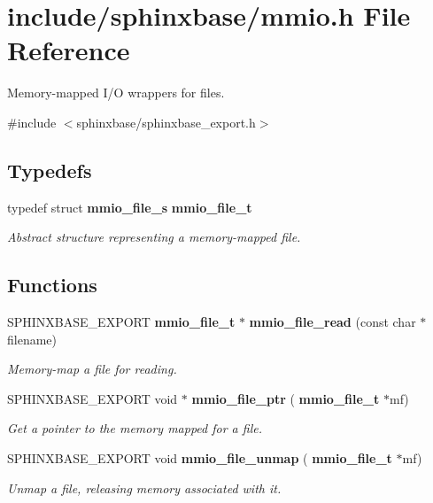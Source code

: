 \section{include/sphinxbase/mmio.h File Reference}
\label{mmio_8h}


Memory-\/mapped I/O wrappers for files.  


{\ttfamily \#include $<$sphinxbase/sphinxbase\+\_\+export.\+h$>$}\newline
\subsection*{Typedefs}
\begin{DoxyCompactItemize}
\item 
\mbox{\label{mmio_8h_ae27ed04d8142d77aae885c8cb8c9fa3b}} 
typedef struct \textbf{ mmio\+\_\+file\+\_\+s} \textbf{ mmio\+\_\+file\+\_\+t}
\begin{DoxyCompactList}\small\item\em Abstract structure representing a memory-\/mapped file. \end{DoxyCompactList}\end{DoxyCompactItemize}
\subsection*{Functions}
\begin{DoxyCompactItemize}
\item 
S\+P\+H\+I\+N\+X\+B\+A\+S\+E\+\_\+\+E\+X\+P\+O\+RT \textbf{ mmio\+\_\+file\+\_\+t} $\ast$ \textbf{ mmio\+\_\+file\+\_\+read} (const char $\ast$filename)
\begin{DoxyCompactList}\small\item\em Memory-\/map a file for reading. \end{DoxyCompactList}\item 
\mbox{\label{mmio_8h_a5e6d8bf5cd7785563abc18c70a31ce0d}} 
S\+P\+H\+I\+N\+X\+B\+A\+S\+E\+\_\+\+E\+X\+P\+O\+RT void $\ast$ \textbf{ mmio\+\_\+file\+\_\+ptr} (\textbf{ mmio\+\_\+file\+\_\+t} $\ast$mf)
\begin{DoxyCompactList}\small\item\em Get a pointer to the memory mapped for a file. \end{DoxyCompactList}\item 
\mbox{\label{mmio_8h_a341a9c1cc8a3c4bddfd2d29a1b0993f6}} 
S\+P\+H\+I\+N\+X\+B\+A\+S\+E\+\_\+\+E\+X\+P\+O\+RT void \textbf{ mmio\+\_\+file\+\_\+unmap} (\textbf{ mmio\+\_\+file\+\_\+t} $\ast$mf)
\begin{DoxyCompactList}\small\item\em Unmap a file, releasing memory associated with it. \end{DoxyCompactList}\end{DoxyCompactItemize}



